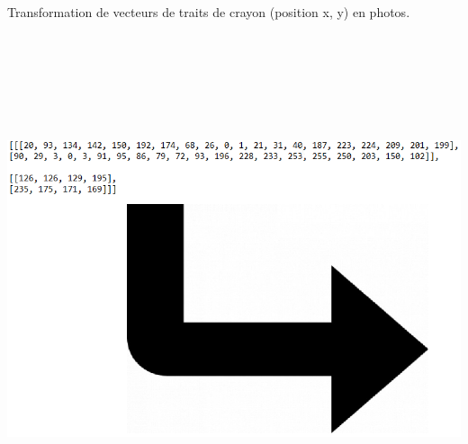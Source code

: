 



\vspace{-2mm}




\begin{center}
Transformation de vecteurs de traits de crayon (position x, y)  en photos.
\end{center}

\begin{center}

\includegraphics[width=15cm,height=15cm,keepaspectratio]{figures/vecteur_fleche.png}

\end{center}
